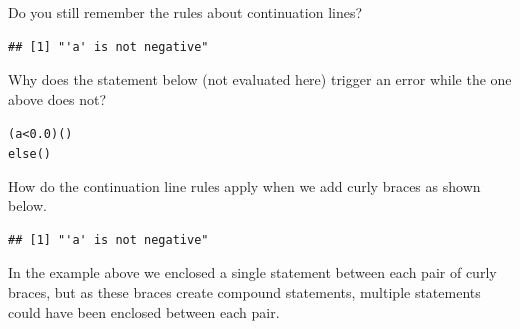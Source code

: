 \documentclass[krantz2]{krantz}\usepackage{knitr}%
\begin{document}
\begin{explainbox}
Do you still remember the rules about continuation lines?

\begin{knitrout}\footnotesize
{}\color{fgcolor}\begin{kframe}
\begin{alltt}
 \hlkwb{<-} 
  \hlopt{<} \hlstd{)} \hlstd{(}\hlstd{)}  \hlstd{(}\hlstd{)}
\end{alltt}
\begin{verbatim}
## [1] "'a' is not negative"
\end{verbatim}
\end{kframe}
\end{knitrout}

Why does the statement below (not evaluated here) trigger an error while the one above does not?

\begin{knitrout}\footnotesize
{}\color{fgcolor}\begin{kframe}
\begin{alltt}
 (a < 0.0) ()
else ()
\end{alltt}
\end{kframe}
\end{knitrout}

How do the continuation line rules apply when we add curly braces as shown below.

\begin{knitrout}\footnotesize
{}\color{fgcolor}\begin{kframe}
\begin{alltt}
 \hlkwb{<-} 
  \hlopt{<} \hlstd{) \{}
    \hlstd{(}\hlstd{)}
  \hlstd{\}}  \hlstd{\{}
    \hlstd{(}\hlstd{)}
  \hlstd{\}}
\end{alltt}
\begin{verbatim}
## [1] "'a' is not negative"
\end{verbatim}
\end{kframe}
\end{knitrout}

In the example above we enclosed a single statement between each pair of curly braces, but as these braces create compound statements, multiple statements could have been enclosed between each pair.
\end{explainbox}
\end{document}
